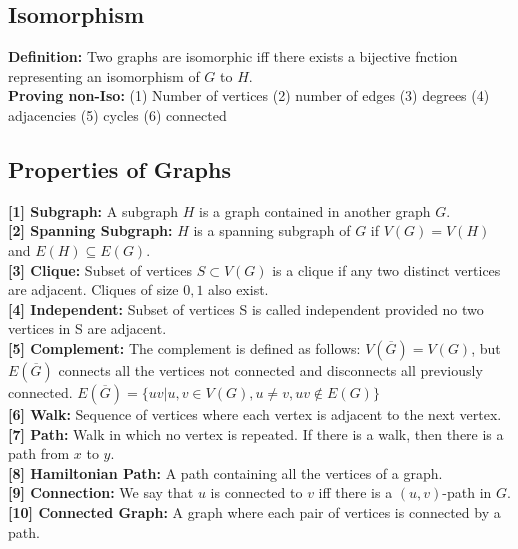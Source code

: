 \subsection{Isomorphism}
\textbf{Definition:} Two graphs are isomorphic iff there exists a bijective fnction representing an isomorphism of $G$ to $H$.\\
\textbf{Proving non-Iso:} (1) Number of vertices (2) number of edges (3) degrees (4) adjacencies (5) cycles (6) connected
\subsection{Properties of Graphs}
\textbf{[1] Subgraph:} A subgraph $H$ is a graph contained in another graph $G$. \\
\textbf{[2] Spanning Subgraph:} $H$ is a spanning subgraph of $G$ if $V(G) = V(H)$ and $E(H) \subseteq E(G)$.\\
\textbf{[3] Clique:} Subset of vertices $S \subset V(G)$ is a clique if any two distinct vertices are adjacent. Cliques of size $0,1$ also exist.\\
\textbf{[4] Independent:} Subset of vertices S is called independent provided no two vertices in S are adjacent. \\
\textbf{[5] Complement:} The complement is defined as follows: $V(\overline{G}) = V(G)$, but $E(\overline{G})$ connects all the vertices not connected and disconnects all previously connected. $E(\overline{G}) = \{uv|u,v \in V(G), u \neq v, uv \notin E(G)\}$ \\
\textbf{[6] Walk:} Sequence of vertices where each vertex is adjacent to the next vertex. \\
\textbf{[7] Path:} Walk in which no vertex is repeated. If there is a walk, then there is a path from $x$ to $y$. \\
\textbf{[8] Hamiltonian Path:} A path containing all the vertices of a graph.\\
\textbf{[9] Connection:} We say that $u$ is connected to $v$ iff there is a $(u,v)$-path in $G$. \\
\textbf{[10] Connected Graph:} A graph where each pair of vertices is connected by a path.
